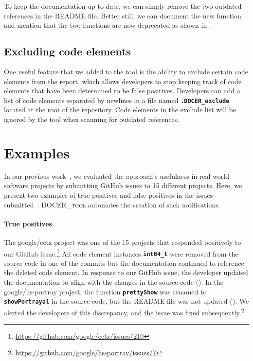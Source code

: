 \documentclass[conference]{IEEEtran}
\newcommand{\codeword}[1]{\texttt{\textbf{\footnotesize#1}}}
\newcommand{\tool}{\textsc{DOCER\_tool}}
\begin{document}
To keep the documentation up-to-date, we can simply remove the two outdated references in the README file. Better still, we can document the new function and mention that the two functions are now deprecated as shown in .

\subsection{Excluding code elements}
\label{sec:tool_feature}
One useful feature that we added to the tool is the ability to exclude certain code elements from the report, which allows developers to stop keeping track of code elements that have been determined to be false positives. Developers can add a list of code elements separated by newlines in a file named \codeword{.DOCER\_exclude} located at the root of the repository. Code elements in the exclude list will be ignored by the tool when scanning for outdated references.

\section{Examples}
\label{sec:examples}
In our previous work~\cite{tan2022detecting}, we evaluated the approach's usefulness in real-world software projects by submitting GitHub issues to 15 different projects. Here, we present two examples of true positives and false positives in the issues submitted~\cite{tan2022detecting}. \tool{} automates the creation of such notifications.

\paragraph{True positives} The google/cctz project was one of the 15 projects that responded positively to our GitHub issue.\footnote{\url{https://github.com/google/cctz/issues/210}} All code element instances \codeword{int64\_t} were removed from the source code in one of the commits but the documentation continued to reference the deleted code element. In response to our GitHub issue, the developer updated the documentation to align with the changes in the source code (). In the google/hs-portray project, the function \codeword{prettyShow} was renamed to \codeword{showPortrayal} in the source code, but the README file was not updated (). We alerted the developers of this discrepancy, and the issue was fixed subsequently.\footnote{\url{https://github.com/google/hs-portray/issues/7}}
\end{document}
